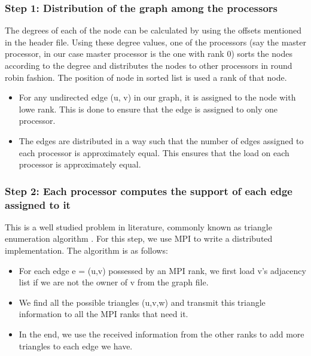 \documentclass{article}
\begin{document}
\subsubsection{Step 1: Distribution of the graph among the processors}
The degrees of each of the node can be calculated by using the offsets mentioned in the header file. Using these degree values, one of the processors (say the master processor, in our case master processor is the one with rank 0) sorts the nodes according to the degree and distributes the nodes to other processors in round robin fashion. The position of node in sorted list is used a rank of that node. \\
\begin{itemize}
    \item For any undirected edge (u, v) in our graph, it is assigned to the node with lowe rank. This is done to ensure that the edge is assigned to only one processor.
    \item The edges are distributed in a way such that the number of edges assigned to each processor is approximately equal. This ensures that the load on each processor is approximately equal.
\end{itemize}

\subsubsection{Step 2: Each processor computes the support of each edge assigned to it}
This is a well studied problem in literature, commonly known as triangle enumeration algorithm . For this step, we use MPI to write a distributed implementation. The algorithm is as follows:

\begin{itemize}
    \item For each edge e = (u,v) possessed by an MPI rank, we first load v's adjacency list if we are not the owner of v from the graph file.
    \item We find all the possible triangles (u,v,w) and transmit this triangle information to all the MPI ranks that need it.
    \item In the end, we use the received information from the other ranks to add more triangles to each edge we have.
\end{itemize}
\end{document}
